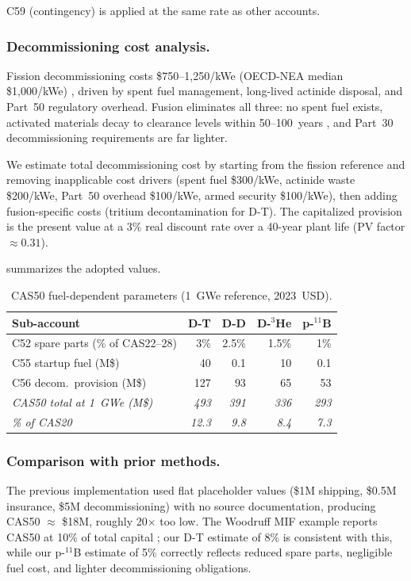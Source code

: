 \documentclass{article}
\begin{document}
\noindent C59 (contingency) is applied at the same rate as other
accounts.

\subsubsection{Decommissioning cost analysis.}
Fission decommissioning costs \$750--1{,}250/kWe (OECD-NEA median
\$1{,}000/kWe) \citep{oecd_nea_decom2016}, driven by spent fuel
management, long-lived actinide disposal, and Part~50 regulatory
overhead. Fusion eliminates all three: no spent fuel exists, activated
materials decay to clearance levels within 50--100~years
\citep{iaea_fusion_decom2020}, and Part~30 decommissioning requirements
are far lighter.

We estimate total decommissioning cost by starting from the fission
reference and removing inapplicable cost drivers (spent fuel
\$300/kWe, actinide waste \$200/kWe, Part~50 overhead
\$100/kWe, armed security \$100/kWe), then adding
fusion-specific costs (tritium decontamination for D-T). The
capitalized provision is the present value at a 3\% real discount
rate over a 40-year plant life (PV factor $\approx 0.31$).

 summarizes the adopted values.

\begin{table}[htbp]
\caption{CAS50 fuel-dependent parameters (1~GWe reference, 2023~USD).}
\label{tab:cas50-fuel}
\centering
\begin{tabular}{lrrrr}
\toprule
Sub-account & D-T & D-D & D-${}^3$He & p-${}^{11}$B \\
\midrule
C52 spare parts (\% of CAS22--28) & 3\% & 2.5\% & 1.5\% & 1\% \\
C55 startup fuel (M\$) & 40 & 0.1 & 10 & 0.1 \\
C56 decom.\ provision (M\$) & 127 & 93 & 65 & 53 \\
\midrule
\textit{CAS50 total at 1~GWe (M\$)} & \textit{493} & \textit{391} & \textit{336} & \textit{293} \\
\textit{\% of CAS20} & \textit{12.3} & \textit{9.8} & \textit{8.4} & \textit{7.3} \\
\bottomrule
\end{tabular}
\end{table}

\subsubsection{Comparison with prior methods.}
The previous implementation used flat placeholder values
(\$1M shipping, \$0.5M insurance, \$5M decommissioning) with no
source documentation, producing CAS50 $\approx$ \$18M, roughly
20$\times$ too low. The Woodruff MIF example reports CAS50 at 10\% of
total capital \citep{woodruff2026}; our D-T estimate of 8\% is
consistent with this, while our p-${}^{11}$B estimate of 5\%
correctly reflects reduced spare parts, negligible fuel cost, and
lighter decommissioning obligations.
\end{document}
